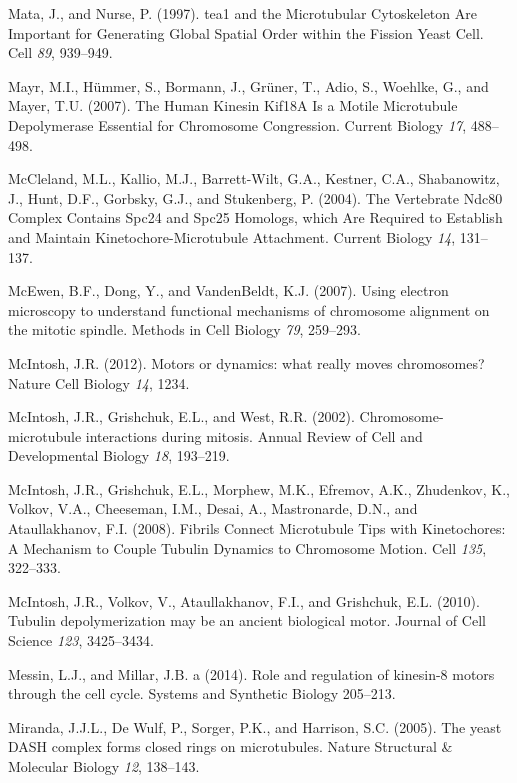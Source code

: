 \documentclass[12pt,a4paper,twoside,openright]{book}
\begin{document}
\hypertarget{ref-Mata1997}{}
Mata, J., and Nurse, P. (1997). tea1 and the Microtubular Cytoskeleton
Are Important for Generating Global Spatial Order within the Fission
Yeast Cell. Cell \emph{89}, 939--949.

\hypertarget{ref-Mayr2007}{}
Mayr, M.I., Hümmer, S., Bormann, J., Grüner, T., Adio, S., Woehlke, G.,
and Mayer, T.U. (2007). The Human Kinesin Kif18A Is a Motile Microtubule
Depolymerase Essential for Chromosome Congression. Current Biology
\emph{17}, 488--498.

\hypertarget{ref-McCleland2004}{}
McCleland, M.L., Kallio, M.J., Barrett-Wilt, G.A., Kestner, C.A.,
Shabanowitz, J., Hunt, D.F., Gorbsky, G.J., and Stukenberg, P. (2004).
The Vertebrate Ndc80 Complex Contains Spc24 and Spc25 Homologs, which
Are Required to Establish and Maintain Kinetochore-Microtubule
Attachment. Current Biology \emph{14}, 131--137.

\hypertarget{ref-McEwen2007}{}
McEwen, B.F., Dong, Y., and VandenBeldt, K.J. (2007). Using electron
microscopy to understand functional mechanisms of chromosome alignment
on the mitotic spindle. Methods in Cell Biology \emph{79}, 259--293.

\hypertarget{ref-McIntosh2012}{}
McIntosh, J.R. (2012). Motors or dynamics: what really moves
chromosomes? Nature Cell Biology \emph{14}, 1234.

\hypertarget{ref-McIntosh2002b}{}
McIntosh, J.R., Grishchuk, E.L., and West, R.R. (2002).
Chromosome-microtubule interactions during mitosis. Annual Review of
Cell and Developmental Biology \emph{18}, 193--219.

\hypertarget{ref-McIntosh2008}{}
McIntosh, J.R., Grishchuk, E.L., Morphew, M.K., Efremov, A.K.,
Zhudenkov, K., Volkov, V.A., Cheeseman, I.M., Desai, A., Mastronarde,
D.N., and Ataullakhanov, F.I. (2008). Fibrils Connect Microtubule Tips
with Kinetochores: A Mechanism to Couple Tubulin Dynamics to Chromosome
Motion. Cell \emph{135}, 322--333.

\hypertarget{ref-McIntosh2010}{}
McIntosh, J.R., Volkov, V., Ataullakhanov, F.I., and Grishchuk, E.L.
(2010). Tubulin depolymerization may be an ancient biological motor.
Journal of Cell Science \emph{123}, 3425--3434.

\hypertarget{ref-Messin2014}{}
Messin, L.J., and Millar, J.B. a (2014). Role and regulation of
kinesin-8 motors through the cell cycle. Systems and Synthetic Biology
205--213.

\hypertarget{ref-Miranda2005}{}
Miranda, J.J.L., De Wulf, P., Sorger, P.K., and Harrison, S.C. (2005).
The yeast DASH complex forms closed rings on microtubules. Nature
Structural \& Molecular Biology \emph{12}, 138--143.
\end{document}
